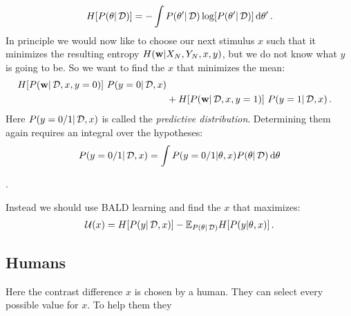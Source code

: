 \begin{align}
	H[{P(\theta | \,\mathcal{D})}] = - \int {P(\theta' | \,\mathcal{D})} \log[{P(\theta' | \,\mathcal{D})}] \,\mathrm{d} \theta' \,.
\end{align}
In principle we would now like to choose our next stimulus $x$ such that it minimizes the resulting entropy $H({\bf w} | X_N, Y_N, x, y)$, but we do not know what $y$ is going to be. So we want to find the $x$ that minimizes the mean:
\begin{align}
	H[{P({\bf w} | \,\mathcal{D}, x, y = 0)}] ~
	{P(y = 0 | \,\mathcal{D}, x)} \\
	&+
	H[{P({\bf w} | \,\mathcal{D}, x, y = 1)}] ~
	{P(y = 1 | \,\mathcal{D}, x)} \,.
\end{align}
Here ${P(y = 0/1 | \,\mathcal{D}, x)}$ is called the \emph{predictive distribution}. Determining them again requires an integral over the hypotheses:
\begin{align}
	{P(y = 0/1 | \,\mathcal{D}, x)}
	= \int {P(y = 0/1 | \theta, x)} {P(\theta| \,\mathcal{D})} \,\mathrm{d} \theta
\end{align}

.

Instead we should use BALD learning and find the $x$ that maximizes:
\begin{align}
	\mathcal{U}(x) = H[{P(y | \,\mathcal{D}, x)}]
	- \mathbb{E}_{{P(\theta | \,\mathcal{D})}} H[{P(y | \theta, x)}] \,.
\end{align}

\subsection{Humans} %
\label{sub:humans}
Here the contrast difference $x$ is chosen by a human. They can select every possible value for $x$. To help them they




